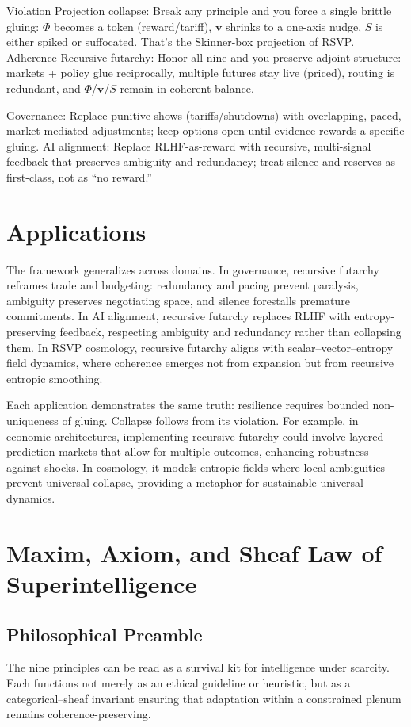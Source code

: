 \documentclass{article}
\newcommand{\ra}{\Rightarrow}
\newcommand{\ra}{\Rightarrow}
\begin{document}
Violation \ra Projection collapse: Break any principle and you force a single brittle gluing: $\Phi$ becomes a token (reward/tariff), $\mathbf{v}$ shrinks to a one-axis nudge, $S$ is either spiked or suffocated. That’s the Skinner-box projection of RSVP. Adherence \ra Recursive futarchy: Honor all nine and you preserve adjoint structure: markets + policy glue reciprocally, multiple futures stay live (priced), routing is redundant, and $\Phi$/$\mathbf{v}$/$S$ remain in coherent balance.

Governance: Replace punitive shows (tariffs/shutdowns) with overlapping, paced, market-mediated adjustments; keep options open until evidence rewards a specific gluing. AI alignment: Replace RLHF-as-reward with recursive, multi-signal feedback that preserves ambiguity and redundancy; treat silence and reserves as first-class, not as “no reward.”

\section{Applications}

The framework generalizes across domains. In governance, recursive futarchy reframes trade and budgeting: redundancy and pacing prevent paralysis, ambiguity preserves negotiating space, and silence forestalls premature commitments. In AI alignment, recursive futarchy replaces RLHF with entropy-preserving feedback, respecting ambiguity and redundancy rather than collapsing them. In RSVP cosmology, recursive futarchy aligns with scalar–vector–entropy field dynamics, where coherence emerges not from expansion but from recursive entropic smoothing.

Each application demonstrates the same truth: resilience requires bounded non-uniqueness of gluing. Collapse follows from its violation. For example, in economic architectures, implementing recursive futarchy could involve layered prediction markets that allow for multiple outcomes, enhancing robustness against shocks. In cosmology, it models entropic fields where local ambiguities prevent universal collapse, providing a metaphor for sustainable universal dynamics.

\section{Maxim, Axiom, and Sheaf Law of Superintelligence}
\label{sec:maxim-axiom-sheaf}

\subsection*{Philosophical Preamble}
The nine principles can be read as a survival kit for intelligence under scarcity.  
Each functions not merely as an ethical guideline or heuristic, but as a 
categorical–sheaf invariant ensuring that adaptation within a constrained plenum 
remains coherence-preserving.  
\end{document}
